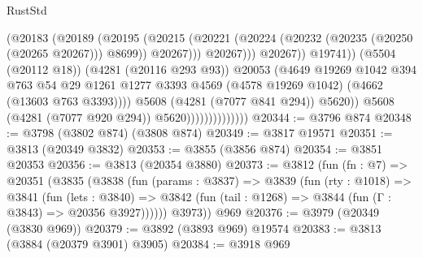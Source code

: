 \begin{lexlean}{RustStd}
\begin{coremodule}
{\begin{coremodule}
{{{{{{{{{{{{{{{{{{{{{{{{{{{{{{{{{{{                                                (@20183
                                                  (@20189
                                                    (@20195
                                                      (@20215
                                                        (@20221
                                                          (@20224
                                                            (@20232
                                                              (@20235 (@20250 (@20265 @20267)))
                                                              @8699))
                                                          @20267)))
                                                    @20267)))
                                              @20267))
                                          @19741))
                                      (@5504 (@20112 @18))
                                      (@4281 (@20116 @293 @93))
                                      @20053
                                      (@4649
                                        @19269
                                        @1042
                                        @394
                                        @763
                                        @54
                                        @29
                                        @1261
                                        @1277
                                        @3393
                                        @4569
                                        (@4578 @19269 @1042)
                                        (@4662 (@13603 @763 @3393))))
                                    @5608
                                    (@4281 (@7077 @841 @294))
                                    @5620))
                                @5608
                                (@4281 (@7077 @920 @294))
                                @5620))))))))))))))
@20344 := @3796 @874
@20348 := @3798 (@3802 @874) (@3808 @874)
@20349 := @3817 @19571
@20351 := @3813 (@20349 @3832)
@20353 := @3855 (@3856 @874)
@20354 := @3851 @20353
@20356 := @3813 (@20354 @3880)
@20373 := @3812
    (fun (fn : @7) =>
    @20351
      (@3835
        (@3838
          (fun (params : @3837) =>
          @3839
            (fun (rty : @1018) =>
            @3841
              (fun (lets : @3840) =>
              @3842 (fun (tail : @1268) => @3844 (fun (Γ : @3843) => @20356 @3927))))))
        @3973))
    @969
@20376 := @3979 (@20349 (@3830 @969))
@20379 := @3892 (@3893 @969) @19574
@20383 := @3813 (@3884 (@20379 @3901) @3905)
@20384 := @3918 @969
}}}}}}}}}}}}}}}}}}}}}}}}}}}}}}}}}}}
\end{coremodule}}
\end{coremodule}
\end{lexlean}
